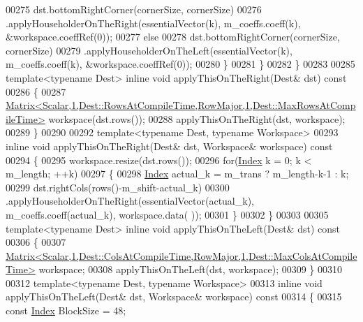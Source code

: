\begin{DoxyCode}
00275             dst.bottomRightCorner(cornerSize, cornerSize)
00276                .applyHouseholderOnTheRight(essentialVector(k), m\_coeffs.coeff(k), &workspace.coeffRef(0));
00277           \textcolor{keywordflow}{else}
00278             dst.bottomRightCorner(cornerSize, cornerSize)
00279                .applyHouseholderOnTheLeft(essentialVector(k), m\_coeffs.coeff(k), &workspace.coeffRef(0));
00280         \}
00281       \}
00282     \}
00283 
00285     \textcolor{keyword}{template}<\textcolor{keyword}{typename} Dest> \textcolor{keyword}{inline} \textcolor{keywordtype}{void} applyThisOnTheRight(Dest& dst)\textcolor{keyword}{ const}
00286 \textcolor{keyword}{    }\{
00287       
      \hyperlink{group___core___module_class_eigen_1_1_matrix}{Matrix<Scalar,1,Dest::RowsAtCompileTime,RowMajor,1,Dest::MaxRowsAtCompileTime>}
       workspace(dst.rows());
00288       applyThisOnTheRight(dst, workspace);
00289     \}
00290 
00292     \textcolor{keyword}{template}<\textcolor{keyword}{typename} Dest, \textcolor{keyword}{typename} Workspace>
00293     \textcolor{keyword}{inline} \textcolor{keywordtype}{void} applyThisOnTheRight(Dest& dst, Workspace& workspace)\textcolor{keyword}{ const}
00294 \textcolor{keyword}{    }\{
00295       workspace.resize(dst.rows());
00296       \textcolor{keywordflow}{for}(\hyperlink{group___core___module_a554f30542cc2316add4b1ea0a492ff02}{Index} k = 0; k < m\_length; ++k)
00297       \{
00298         \hyperlink{group___core___module_a554f30542cc2316add4b1ea0a492ff02}{Index} actual\_k = m\_trans ? m\_length-k-1 : k;
00299         dst.rightCols(rows()-m\_shift-actual\_k)
00300            .applyHouseholderOnTheRight(essentialVector(actual\_k), m\_coeffs.coeff(actual\_k), workspace.data(
      ));
00301       \}
00302     \}
00303 
00305     \textcolor{keyword}{template}<\textcolor{keyword}{typename} Dest> \textcolor{keyword}{inline} \textcolor{keywordtype}{void} applyThisOnTheLeft(Dest& dst)\textcolor{keyword}{ const}
00306 \textcolor{keyword}{    }\{
00307       
      \hyperlink{group___core___module_class_eigen_1_1_matrix}{Matrix<Scalar,1,Dest::ColsAtCompileTime,RowMajor,1,Dest::MaxColsAtCompileTime>}
       workspace;
00308       applyThisOnTheLeft(dst, workspace);
00309     \}
00310 
00312     \textcolor{keyword}{template}<\textcolor{keyword}{typename} Dest, \textcolor{keyword}{typename} Workspace>
00313     \textcolor{keyword}{inline} \textcolor{keywordtype}{void} applyThisOnTheLeft(Dest& dst, Workspace& workspace)\textcolor{keyword}{ const}
00314 \textcolor{keyword}{    }\{
00315       \textcolor{keyword}{const} \hyperlink{group___core___module_a554f30542cc2316add4b1ea0a492ff02}{Index} BlockSize = 48;

\end{DoxyCode}
